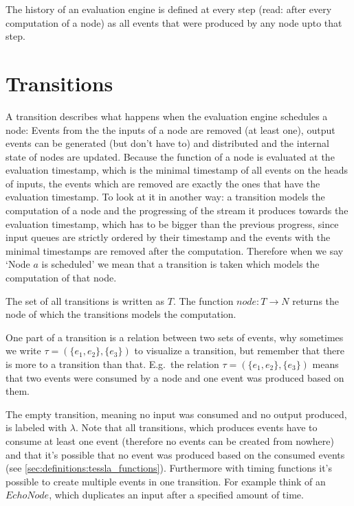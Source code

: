 The history of an evaluation engine is defined at every step (read: after every computation of a node) as all events that were produced by any node upto that step.

\section{Transitions}
\label{sec:definitions:transitions}

A transition describes what happens when the evaluation engine schedules a node:
Events from the the inputs of a node are removed (at least one), output events can be generated (but don't have to) and distributed and the internal state of nodes are updated.
Because the function of a node is evaluated at the evaluation timestamp, which is the minimal timestamp of all events on the heads of inputs, the events which are removed are exactly the ones that have the evaluation timestamp.
To look at it in another way: a transition models the computation of a node and the progressing of the stream it produces towards the evaluation timestamp, which has to be bigger than the previous progress, since input queues are strictly ordered by their timestamp and the events with the minimal timestamps are removed after the computation.
Therefore when we say `Node \(a\) is scheduled' we mean that a transition is taken which models the computation of that node.

The set of all transitions is written as \(T\).
The function \(\mathit{node} : T \rightarrow N\) returns the node of which the transitions models the computation.

One part of a transition is a relation between two sets of events, why sometimes we write \(\tau = (\{e_1, e_2\}, \{e_3\})\) to visualize a transition, but remember that there is more to a transition than that.
E.g.\ the relation \(\tau = (\{e_1,e_2\}, \{e_3\})\) means that two events were consumed by a node and one event was produced based on them.

The empty transition, meaning no input was consumed and no output produced, is labeled with \(\lambda\).
Note that all transitions, which produces events have to consume at least one event (therefore no events can be created from nowhere) and that it's possible that no event was produced based on the consumed events (see \cref{sec:definitions:tessla_functions}).
Furthermore with timing functions it's possible to create multiple events in one transition.
For example think of an \(\mathit{EchoNode}\), which duplicates an input after a specified amount of time.

